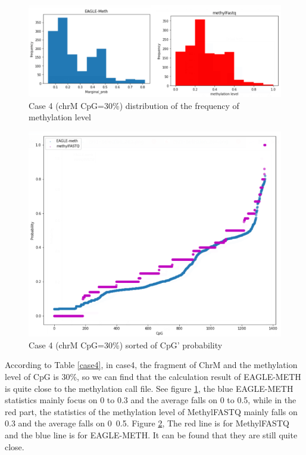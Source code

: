 \documentclass{PHlab-thesis}
\begin{document}
\begin{figure}[h!]
  \centering
  \includegraphics[scale=0.75]{figures/CHRM_30.PNG}
  \caption{Case 4 (chrM CpG=30\%) distribution of the frequency of methylation level}
  \label{fig:case_4_1} 
\end{figure}
\begin{figure}[h!]
  \centering
  \includegraphics[scale=0.8]{figures/CHRM_30_2.PNG}
  \caption{Case 4 (chrM CpG=30\%) sorted of CpG' probability}
  \label{fig:case_4_2} 
\end{figure}
\vfill
\par According to Table \ref{case4}, in case4, the fragment of ChrM and the methylation level of CpG is 30\%, so we can find that the calculation result of EAGLE-METH is quite close to the methylation call file.
See figure \ref{fig:case_4_1}, the blue EAGLE-METH statistics mainly focus on 0 to 0.3 and the average falls on 0 to 0.5, while in the red part, the statistics of the methylation level of MethylFASTQ mainly falls on 0.3 and the average falls on 0~0.5. Figure \ref{fig:case_4_2}, The red line is for MethylFASTQ and the blue line is for EAGLE-METH. It can be found that they are still quite close.
\end{document}
